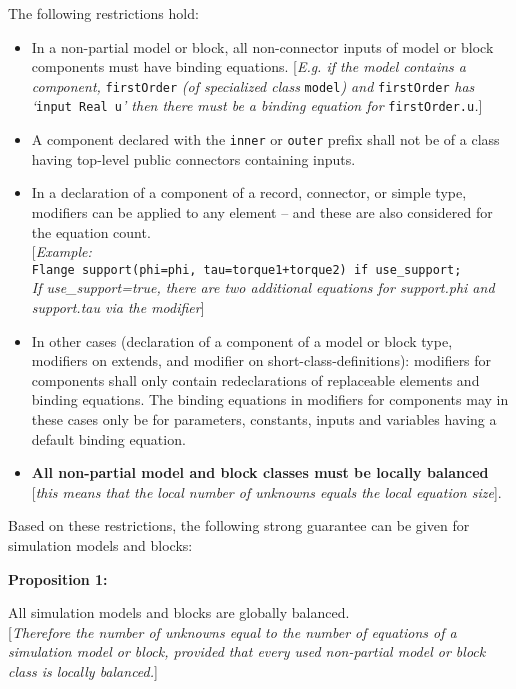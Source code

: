 The following restrictions hold:

\begin{itemize}
\item
  In a non-partial model or block, all non-connector inputs of model or
  block components must have binding equations. {[}\emph{E.g. if the
  model contains a component,} \lstinline!firstOrder! \emph{(of specialized class}
  \lstinline!model!\emph{) and} \lstinline!firstOrder! \emph{has `}\lstinline!input Real u!\emph{' then
  there must be a binding equation for} \lstinline!firstOrder.u!\emph{.}{]}
\item
  A component declared with the \lstinline!inner! or \lstinline!outer! prefix shall not be of a
  class having top-level public connectors containing inputs.
\item
  In a declaration of a component of a record, connector, or simple
  type, modifiers can be applied to any element -- and these are also
  considered for the equation count.\\
  {[}\emph{Example:}\\
\lstinline!Flange support(phi=phi, tau=torque1+torque2) if use_support;!\\
  \emph{If use\_support=true, there are two additional equations for
  support.phi and support.tau via the modifier}{]}
\item
  In other cases (declaration of a component of a model or block type,
  modifiers on extends, and modifier on short-class-definitions):
  modifiers for components shall only contain redeclarations of
  replaceable elements and binding equations. The binding equations in
  modifiers for components may in these cases only be for parameters,
  constants, inputs and variables having a default binding equation.
\item
  \textbf{All non-partial model and block classes must be locally
  balanced} {[}\emph{this means that the local number of unknowns equals
  the local equation size}{]}.
\end{itemize}

Based on these restrictions, the following strong guarantee can be given
for simulation models and blocks:

\textbf{Proposition 1:}

All simulation models and blocks are globally balanced.\\
{[}\emph{Therefore the number of unknowns equal to the number of
equations of a simulation model or block, provided that every used
non-partial model or block class is locally balanced.}{]}


